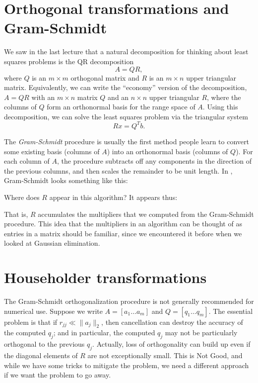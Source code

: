 \documentclass[12pt, leqno]{article}
\begin{document}

\section*{Orthogonal transformations and Gram-Schmidt}

We saw in the last lecture that a natural decomposition for thinking
about least squares problems is the QR decomposition
\[
  A = QR,
\]
where $Q$ is an $m \times m$ orthogonal matrix and $R$ is an $m \times
n$ upper triangular matrix.  Equivalently, we can write the
``economy'' version of the decomposition, $A = QR$ with an $m \times
n$ matrix $Q$ and an $n \times n$ upper triangular $R$, where the
columns of $Q$ form an orthonormal basis for the range space of
$A$. Using this decomposition, we can solve the least squares problem
via the triangular system
\[
  Rx = Q^T b.
\]

The {\em Gram-Schmidt} procedure is usually the first method people
learn to convert some existing basis (columns of $A$) into an
orthonormal basis (columns of $Q$).  For each column of $A$, the procedure
subtracts off any components in the direction of the previous columns,
and then scales the remainder to be unit length. In \matlab, Gram-Schmidt looks
something like this:


Where does $R$ appear in this algorithm?  It appears thus:

That is, $R$ accumulates the multipliers that we computed from
the Gram-Schmidt procedure.  This idea that the multipliers
in an algorithm can be thought of as entries in a matrix should
be familiar, since we encountered it before when we looked at
Gaussian elimination.

\section*{Householder transformations}

The Gram-Schmidt orthogonalization procedure is not generally
recommended for numerical use.  Suppose we write $A = [a_1 \ldots
  a_m]$ and $Q = [q_1 \ldots q_m]$.  The essential problem is that if
$r_{jj} \ll \|a_j\|_2$, then cancellation can destroy the accuracy of
the computed $q_j$; and in particular, the computed $q_j$ may not be
particularly orthogonal to the previous $q_j$.  Actually, loss of
orthogonality can build up even if the diagonal elements of $R$ are
not exceptionally small.  This is Not Good, and while we have some
tricks to mitigate the problem, we need a different approach if we
want the problem to go away.
\end{document}
